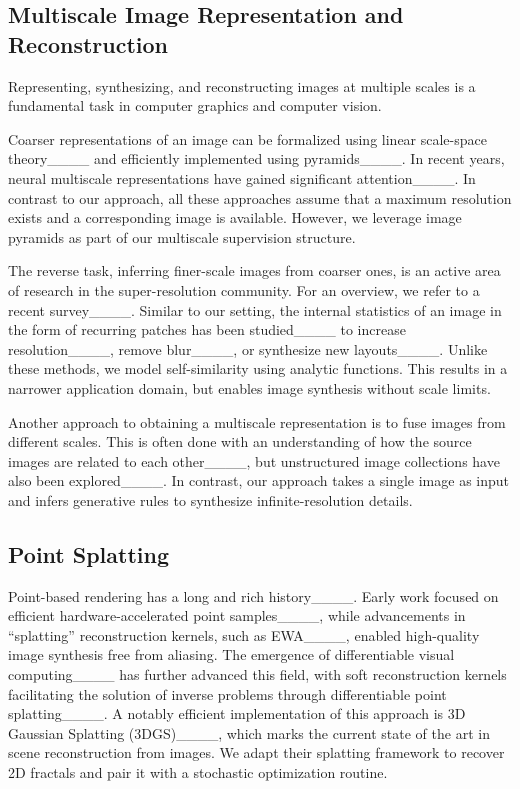 
\subsection{Multiscale Image Representation and Reconstruction}
\label{sec:multiscale}

Representing, synthesizing, and reconstructing images at multiple scales is a fundamental task in computer graphics and computer vision. 

Coarser representations of an image can be formalized using linear scale-space theory____ and efficiently implemented using pyramids____. 
In recent years, neural multiscale representations have gained significant attention____.
In contrast to our approach, all these approaches assume that a maximum resolution exists and a corresponding image is available.
However, we leverage image pyramids as part of our multiscale supervision structure.

The reverse task, inferring finer-scale images from coarser ones, is an active area of research in the super-resolution community.
For an overview, we refer to a recent survey____.
Similar to our setting, the internal statistics of an image in the form of recurring patches has been studied____ to increase resolution____, remove blur____, or synthesize new layouts____.
Unlike these methods, we model self-similarity using analytic functions.
This results in a narrower application domain, but enables image synthesis without scale limits.

Another approach to obtaining a multiscale representation is to fuse images from different scales. 
This is often done with an understanding of how the source images are related to each other____, but unstructured image collections have also been explored____.
In contrast, our approach takes a single image as input and infers generative rules to synthesize infinite-resolution details.




\subsection{Point Splatting}
\label{sec:point_splatting}

Point-based rendering has a long and rich history____. 
Early work focused on efficient hardware-accelerated point samples____, while advancements in ``splatting'' reconstruction kernels, such as EWA____, enabled high-quality image synthesis free from aliasing. 
The emergence of differentiable visual computing____ has further advanced this field, with soft reconstruction kernels facilitating the solution of inverse problems through differentiable point splatting____. 
A notably efficient implementation of this approach is 3D Gaussian Splatting (3DGS)____, which marks the current state of the art in scene reconstruction from images. 
We adapt their splatting framework to recover 2D fractals and pair it with a stochastic optimization routine.

